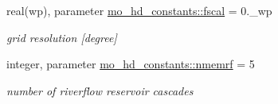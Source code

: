 \begin{DoxyCompactItemize}
real(wp), parameter \hyperlink{namespacemo__hd__constants_ad75b06fdc814a4a8eefcb76b47760ded}{mo\+\_\+hd\+\_\+constants\+::fscal} = 0.\+\_\+wp
\begin{DoxyCompactList}\small\item\em grid resolution \mbox{[}degree\mbox{]} \end{DoxyCompactList}\item 
integer, parameter \hyperlink{namespacemo__hd__constants_a3f303b1ab15b9bc83ce3cca3beb1bfd0}{mo\+\_\+hd\+\_\+constants\+::nmemrf} = 5
\begin{DoxyCompactList}\small\item\em number of riverflow reservoir cascades \end{DoxyCompactList}\end{DoxyCompactItemize}

